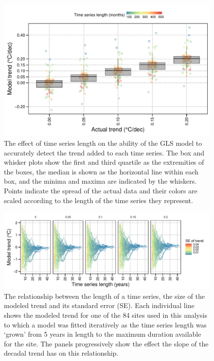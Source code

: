 \documentclass[]{ametsoc}
\begin{document}
\begin{figure}
\centering \includegraphics[width=1.0\textwidth]{figure03}
\caption[\small The effect of time series length on the ability of the GLS model to accurately detect the trend]{The effect of time series length on the ability of the GLS model to accurately detect the trend added to each time series. The box and whisker plots show the first and third quartile as the extremities of the boxes, the median is shown as the horizontal line within each box, and the minima and maxima are indicated by the whiskers. Points indicate the spread of the actual data and their colors are scaled according to the length of the time series they represent.}
\label{figure03}
\end{figure}

\begin{figure}
\centering \includegraphics[width=1.0\textwidth]{figure04}
\caption[\small The relationship between the length of a time series, the size of the modeled trend and its standard error (SE)]{The relationship between the length of a time series, the size of the modeled trend and its standard error (SE). Each individual line shows the modeled trend for one of the 84 sites used in this analysis to which a model was fitted iteratively as the time series length was `grown' from 5 years in length to the maximum duration available for the site. The panels progressively show the effect the slope of the decadal trend has on this relationship.}
\label{figure04}
\end{figure}
\end{document}
